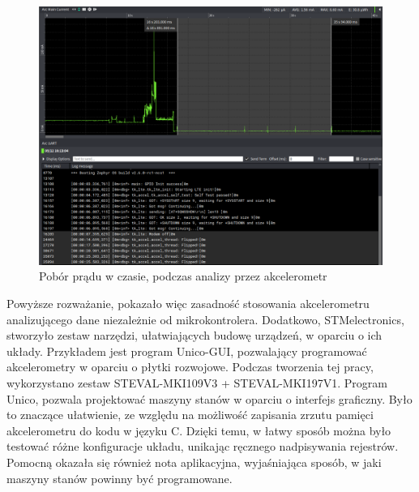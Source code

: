 \begin{figure}[h]
    \centering
    \includegraphics[width=15cm]{Graphics/recognize_acc.png}
    \caption{Pobór prądu w czasie, podczas analizy przez akcelerometr}
    \label{img:recognize_acc}
\end{figure}
Powyższe rozważanie, pokazało więc zasadność stosowania akcelerometru analizującego dane niezależnie od mikrokontrolera. Dodatkowo, STMelectronics, stworzyło zestaw narzędzi, ułatwiających budowę urządzeń, w oparciu o ich układy. Przykładem jest program Unico-GUI\cite{unico}, pozwalający programować akcelerometry w oparciu o płytki rozwojowe. Podczas tworzenia tej pracy, wykorzystano zestaw STEVAL-MKI109V3 + STEVAL-MKI197V1. Program Unico, pozwala projektować maszyny stanów w oparciu o interfejs graficzny. Było to znaczące ułatwienie, ze względu na możliwość zapisania zrzutu pamięci akcelerometru do kodu w języku C. Dzięki temu, w łatwy sposób można było testować różne konfiguracje układu, unikając ręcznego nadpisywania rejestrów. Pomocną okazała się również nota aplikacyjna, wyjaśniająca sposób, w jaki maszyny stanów powinny być programowane.\cite{lsm6dsoxappnote}

